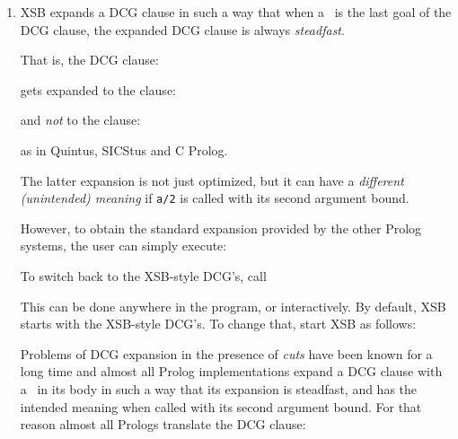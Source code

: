\begin{enumerate}
\item XSB expands a DCG clause in such a way that when a \cut\ is 
      the last goal of the DCG clause, the expanded DCG clause is always 
      {\em steadfast}.

      That is, the DCG clause:


      \noindent
      gets expanded to the clause:


      \noindent
      and {\em not\/} to the clause:


      \noindent
      as in Quintus, SICStus and C Prolog.

      The latter expansion is not just optimized, but it can have a
      {\em different (unintended) meaning} if {\tt a/2} is called with
      its second argument bound.

      However, to obtain the standard expansion provided by the other Prolog
      systems, the user can simply execute:
      
    
      To switch back to the XSB-style DCG's, call
      

      This can be done anywhere in the program, or interactively.
      By default, XSB starts with the XSB-style DCG's. To change that,
      start XSB as follows:


      Problems of DCG expansion in the presence of {\em cuts} have been known
      for a long time and almost all Prolog implementations expand a DCG
      clause with a \cut\ in its body in such a way that its expansion is
      steadfast, and has the intended meaning when called with its second
      argument bound.  For that reason almost all Prologs translate the DCG
      clause:



\end{enumerate}
